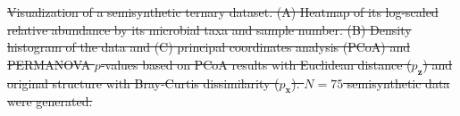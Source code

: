 \documentclass[11pt]{article}
\newcommand{\1}{{\rm 1}\kern-0.24em{\rm I}}
\providecommand{\DIFdeltex}[1]{{\protect\color{red}\sout{#1}}}                      %
\providecommand{\DIFaddbegin}{} %
\providecommand{\DIFaddend}{} %
\providecommand{\DIFdelbegin}{} %
\providecommand{\DIFdelend}{} %
\providecommand{\DIFdelFL}[1]{\DIFdel{#1}} %
\providecommand{\DIFdel}[1]{\texorpdfstring{\DIFdeltex{#1}}{}} %
\newcommand{\DIFscaledelfig}{0.5}
\newlength{\DIFdelgraphicswidth} %
\newlength{\DIFdelgraphicsheight} %
\newcommand{\DIFaddincludegraphics}[2][]{{\color{blue}\fbox{\DIFOincludegraphics[#1]{#2}}}} %
\newcommand{\DIFdelincludegraphics}[2][]{%
\sbox{\DIFdelgraphicsbox}{\DIFOincludegraphics[#1]{#2}}%
\settoboxwidth{\DIFdelgraphicswidth}{\DIFdelgraphicsbox} %
\settoboxtotalheight{\DIFdelgraphicsheight}{\DIFdelgraphicsbox} %
\scalebox{\DIFscaledelfig}{%
\parbox[b]{\DIFdelgraphicswidth}{\usebox{\DIFdelgraphicsbox}\\[-\baselineskip] \rule{\DIFdelgraphicswidth}{0em}}\llap{\resizebox{\DIFdelgraphicswidth}{\DIFdelgraphicsheight}{%
\setlength{\unitlength}{\DIFdelgraphicswidth}%
\begin{picture}(1,1)%
\thicklines\linethickness{2pt} %
{\color[rgb]{1,0,0}\put(0,0){\framebox(1,1){}}}%
{\color[rgb]{1,0,0}\put(0,0){\line( 1,1){1}}}%
{\color[rgb]{1,0,0}\put(0,1){\line(1,-1){1}}}%
\end{picture}%
}\hspace*{3pt}}} %
} %
\DeclareRobustCommand{\DIFaddbegin}{\DIFOaddbegin \let\includegraphics\DIFaddincludegraphics} %
\DeclareRobustCommand{\DIFaddend}{\DIFOaddend \let\includegraphics\DIFOincludegraphics} %
\DeclareRobustCommand{\DIFdelbegin}{\DIFOdelbegin \let\includegraphics\DIFdelincludegraphics} %
\DeclareRobustCommand{\DIFdelend}{\DIFOaddend \let\includegraphics\DIFOincludegraphics} %
\begin{document}
\DIFdelbegin %
{%
\DIFdelFL{Visualization of a semisynthetic ternary dataset. (A) Heatmap of its log-scaled relative abundance by its microbial taxa and sample number. (B) Density histogram of the data and (C) principal coordinates analysis (PCoA) and PERMANOVA $p$-values based on PCoA results with Euclidean distance ($p_\mathbf{z}$) and original structure with Bray-Curtis dissimilarity ($p_\mathbf{x}$). $N=75$ semisynthetic data were generated.}}
\DIFdelend %


\begin{singlespace}

\DIFdelbegin %
\DIFdelend \DIFaddbegin 
\DIFaddend \end{singlespace}
\end{document}
